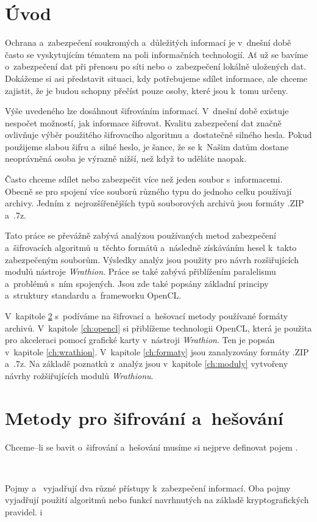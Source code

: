 \chapter{Úvod}
Ochrana a~zabezpečení soukromých a~důležitých informací je v~dnešní době často se vyskytujícím
tématem na poli informačních technologií. Ať už se bavíme o~zabezpečení dat při přenosu po síti
nebo o~zabezpečení lokálně uložených dat. Dokážeme si asi představit situaci, kdy potřebujeme
sdílet informace, ale chceme zajistit, že je budou schopny přečíst pouze osoby, které jsou k~tomu
určeny.

 Výše uvedeného lze dosáhnout šifrováním informací. V~dnešní době existuje nespočet možností, jak
informace šifrovat. Kvalitu zabezpečení dat značně ovlivňuje výběr použitého šifrovacího
algoritmu a~dostatečně silného hesla. Pokud použijeme slabou šifru a~silné heslo, je
šance, že se k~Našim datům dostane neoprávněná osoba je výrazně nižší, než když to uděláte naopak.

 Často chceme sdílet nebo zabezpečit více než jeden soubor s~informacemi. Obecně se pro
spojení více souborů různého typu do jednoho celku používají archivy. Jedním z~nejrozšířenějších
typů souborových archivů jsou formáty .ZIP a~.7z.

 Tato práce se převážně zabývá analýzou používaných metod zabezpečení a~šifrovacích
algoritmů u~těchto formátů a~následně získáváním hesel k~takto zabezpečeným souborům. Výsledky
analýz jsou použity pro návrh rozšiřujících modulů nástroje {\it Wrathion}. Práce se také
zabývá přiblížením paralelismu a~problémů s~ním spojených. Jsou zde také popsány základní
principy a~struktury standardu a~frameworku OpenCL.

 V~kapitole \ref{ch:sifrovani} s~podíváme na šifrovací a~hešovací metody používané formáty
archivů. V~kapitole \ref{ch:opencl} si přiblížeme technologii OpenCL, která je použita pro
akceleraci pomocí grafické karty v~nástroji {\it Wrathion}. Ten je popsán v~kapitole
\ref{ch:wrathion}. V~kapitole \ref{ch:formaty} jsou zanalyzovány formáty .ZIP a~.7z. Na základě
poznatků z~analýz jsou v~kapitole \ref{ch:moduly} vytvořeny návrhy rožšiřujících modulů {\it
Wrathionu}. 
\chapter{Metody pro šifrování a~hešování}
\label{ch:sifrovani}
Chceme--li se bavit o~šifrování a~hešování musíme si nejprve definovat pojem .
\begin{defn}
    ~\cite{AC:1996} 
\end{defn}
Pojmy  a~ vyjadřují dva různé přístupy k~zabezpečení informací. Oba pojmy
vyjadřují použití algoritmů nebo funkcí navrhnutých na základě kryptografických pravidel. 
i
